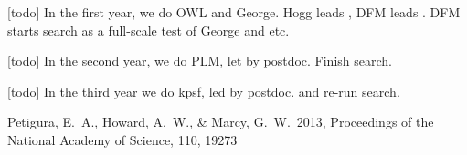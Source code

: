 \documentclass[letterpaper,12pt,preprint]{hack_aastex}
\begin{document}
[todo] In the first year, we do OWL and George.  Hogg leads \OWL, DFM leads \George.  DFM starts search as a full-scale test of George and etc.

[todo] In the second year, we do PLM, let by postdoc.  Finish search.

[todo] In the third year we do kpsf, led by postdoc.  and re-run search.

\clearpage
\begin{thebibliography}{}\raggedright%

Petigura, E.~A., Howard, A.~W., \& Marcy, G.~W.\ 2013,
Proceedings of the National Academy of Science, 110, 19273

\end{thebibliography}
\end{document}
